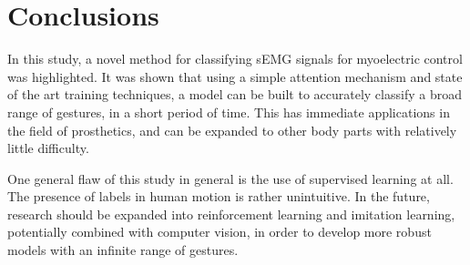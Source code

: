 \section{Conclusions}

In this study, a novel method for classifying sEMG signals for myoelectric control was highlighted. It was shown that using a simple attention mechanism and state of the art training techniques, a model can be built to accurately classify a broad range of gestures, in a short period of time. This has immediate applications in the field of prosthetics, and can be expanded to other body parts with relatively little difficulty. \par
One general flaw of this study in general is the use of supervised learning at all. The presence of labels in human motion is rather unintuitive. In the future, research should be expanded into reinforcement learning and imitation learning, potentially combined with computer vision, in order to develop more robust models with an infinite range of gestures.

